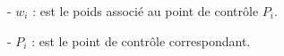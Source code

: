 \vspace{-0,2 cm}

- \( w_i \) : est le poids associé au point de contrôle \( P_i \).

\vspace{-0,2 cm}

- \( P_i \) : est le point de contrôle correspondant.

